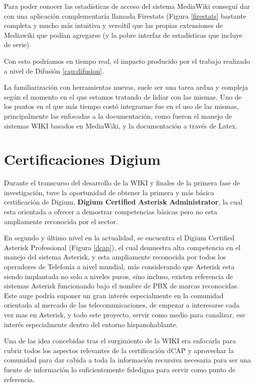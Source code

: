 Para poder conocer las estadísticas de acceso del sistema MediaWiki conseguí dar con una aplicación complementaría llamada Firestats \cite{website:firestats} (Figura \ref{firestats} bastante completa y mucho más intuitiva y versátil que las propias extensiones de Mediawiki que podían agregarse (y la pobre interfaz de estadísticas que incluye de serie) \cite{website:wikifirestats}

Con esto podríamos en tiempo real, el impacto producido por el trabajo realizado a nivel de Difusión \ref{cap:difusion}.

La familiarización con herramientas nuevas, suele ser una tarea ardua y compleja según el momento en el que estamos tratando de lidiar con las mismas.
Uno de los puntos en el que más tiempo costó integrarme fue en el uso de las mismas, principalmente las enfocadas a la documentación, como fueron el manejo de sistemas WIKI basados en MediaWiki, y la documentación a través de Latex. 


\section*{Certificaciones Digium}

Durante el transcurso del desarrollo de la WIKI y finales de la primera fase de investigación, tuve la oportunidad de obtener la primera y más básica certificación de Digium, \textbf{Digium Certified Asterisk Administrator}, la cual esta orientada a ofrecer a demostrar competencias básicas pero no esta ampliamente reconocida por el sector.

En segundo y último nivel en la actualidad, se encuentra el Digium Certified Asterisk Professional (Figura \ref{dcap}), el cual demuestra alta competencia en el manejo del sistema Asterisk, y esta ampliamente reconocida por todos los operadores de Telefonía a nivel mundial, más considerando que Asterisk esta siendo implantada no solo a niveles puros, sino incluso, existen referencia de sistemas Asterisk funcionando bajo el nombre de PBX de marcas reconocidas. Este auge podría suponer un gran interés especialmente en la comunidad orientada al mercado de las telecomunicaciones, de empezar a interesarse cada vez mas en Asterisk, y todo este proyecto, servir como medio para canalizar, ese interés especialmente dentro del entorno hispanohablante.

Una de las idea concebidas tras el surgimiento de la WIKI era enfocarla para cubrir todos los aspectos relevantes de la certificación dCAP y aprovechar la comunidad para dar cabida a toda la información  recursiva necesaria para ser una fuente de información lo suficientemente fidedigna para servir como punto de referencia.

